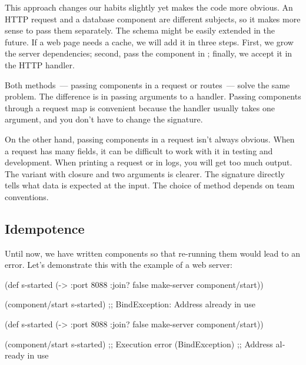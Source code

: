 \fi

This approach changes our habits slightly yet makes the code more obvious. An HTTP request and a database component are different subjects, so it makes more sense to pass them separately. The schema might be easily extended in the future. If a web page needs a cache, we will add it in three steps. First, we grow the server dependencies; second, pass the component in ; finally, we accept it in the HTTP handler.

Both methods~--- passing components in a request or routes~--- solve the same problem. The difference is in passing arguments to a handler. Passing components through a request map is convenient because the handler usually takes one argument, and you don't have to change the signature.

On the other hand, passing components in a request isn't always obvious. When a request has many fields, it can be difficult to work with it in testing and development. When printing a request or in logs, you will get too much output. The variant with closure and two arguments is clearer. The signature directly tells what data is expected at the input. The choice of method depends on team conventions.

\subsection{Idempotence}

Until now, we have written components so that re-running them would lead to an error. Let's demonstrate this with the example of a web server:

\ifnarrow

\begin{english}
  \begin{clojure}
(def s-started
  (-> {:port 8088 :join? false}
      make-server
      component/start))

(component/start s-started)
;; BindException: Address already in use
  \end{clojure}
\end{english}

\else

\begin{english}
  \begin{clojure}
(def s-started (-> {:port 8088 :join? false}
                    make-server
                    component/start))

(component/start s-started)
;; Execution error (BindException)
;; Address already in use
  \end{clojure}
\end{english}

